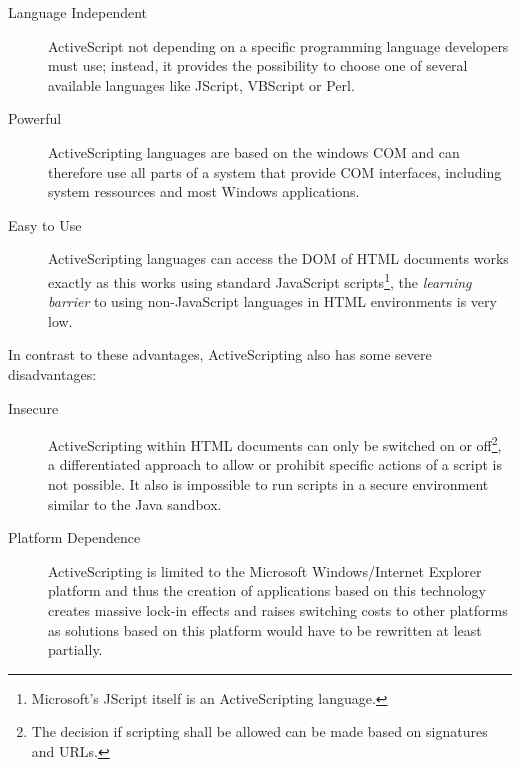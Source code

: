 \begin{description}
	
	\item [Language Independent] ActiveScript not depending on a specific programming language developers must use; instead, it provides the possibility to choose one of several available languages like JScript, VBScript or Perl.
	
	\item [Powerful] ActiveScripting languages are based on the windows COM and can therefore use all parts of a system that provide COM interfaces, including system ressources and most Windows applications.
	
	\item [Easy to Use] ActiveScripting languages can access the DOM of HTML documents works exactly as this works using standard JavaScript scripts\footnote{Microsoft's JScript itself is an ActiveScripting language.}, the \emph{learning barrier} to using non-JavaScript languages in HTML environments is very low.

\end{description}

In contrast to these advantages, ActiveScripting also has some severe disadvantages:

\begin{description}
  
  \item [Insecure] ActiveScripting within HTML documents can only be switched on or off\footnote{The decision if scripting shall be allowed can be made based on signatures and URLs.}, a differentiated approach to allow or prohibit specific actions of a script is not possible. It also is impossible to run scripts in a secure environment similar to the Java sandbox.
  
  \item [Platform Dependence] ActiveScripting is limited to the Microsoft Windows/Internet Explorer platform and thus the creation of applications based on this technology creates massive lock-in effects and raises switching costs to other platforms as solutions based on this platform would have to be rewritten at least partially.
  
\end{description}